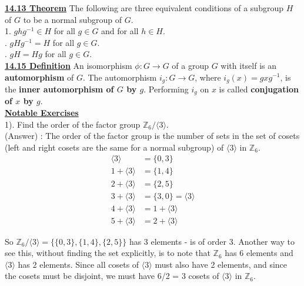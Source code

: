 \documentclass[12pt, letterpaper]{article}
\begin{document}
\noindent \underline{\bf 14.13 Theorem} The following are three equivalent conditions of a subgroup $H$ of $G$ to be a normal subgroup of $G$. \\

1. $ghg^{-1} \in H$ for all $g \in G$ and for all $h \in H$. \\
. $gHg^{-1} = H$ for all $g \in G$. \\
. $gH = Hg$ for all $g \in G$. \\

\noindent \underline{\bf  14.15 Definition} An isomorphism $\phi : G \rightarrow G$ of a group $G$ with itself is an {\bf automorphism} of $G$. The automorphism $i_g : G \rightarrow G$, where $i_g(x) = gxg^{-1}$, is the {\bf inner automorphism of $G$ by $g$}. Performing $i_g$ on $x$ is called {\bf conjugation of $x$ by $g$}. \\

\noindent \underline{\bf Notable Exercises} \\

1). Find the order of the factor group $\mathbb{Z}_6 / \langle 3 \rangle$. \\

(Answer) : The order of the factor group is the number of sets in the set of cosets (left and right cosets are the same for a normal subgroup) of $\langle 3 \rangle$ in $\mathbb{Z}_6$. \\

\begin{align*}
\langle 3 \rangle &= \{0,3\} \\
1 + \langle 3 \rangle &= \{1,4\} \\
2 + \langle 3 \rangle &= \{2,5\} \\
3 + \langle 3 \rangle &= \{3,0\} = \langle 3 \rangle \\
4 + \langle 3 \rangle &= 1 + \langle 3 \rangle \\
5 + \langle 3 \rangle &= 2 + \langle 3 \rangle
\end{align*}

So $\mathbb{Z}_6 / \langle 3 \rangle = \{\{0,3\},\{1,4\}, \{2,5\}\}$ has 3 elements - is of order 3. Another way to see this, without finding the set explicitly, is to note that $\mathbb{Z}_6$ has 6 elements and $\langle 3 \rangle$ has 2 elements. Since all cosets of $\langle 3 \rangle$ must also have 2 elements, and since the cosets must be disjoint, we must have 6/2 = 3 cosets of $\langle 3 \rangle$ in $\mathbb{Z}_6$. \\
\end{document}
